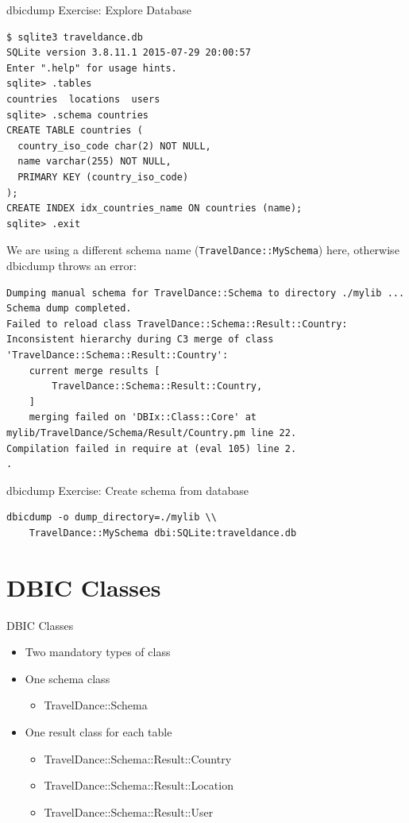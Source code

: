 \begin{frame}[fragile]{dbicdump Exercise: Explore Database}
\begin{lstlisting}
$ sqlite3 traveldance.db
SQLite version 3.8.11.1 2015-07-29 20:00:57
Enter ".help" for usage hints.
sqlite> .tables
countries  locations  users
sqlite> .schema countries
CREATE TABLE countries (
  country_iso_code char(2) NOT NULL,
  name varchar(255) NOT NULL,
  PRIMARY KEY (country_iso_code)
);
CREATE INDEX idx_countries_name ON countries (name);
sqlite> .exit
\end{lstlisting}
\end{frame}

We are using a different schema name (\verb|TravelDance::MySchema|) here,
otherwise dbicdump throws an error:

\begin{lstlisting}
Dumping manual schema for TravelDance::Schema to directory ./mylib ...
Schema dump completed.
Failed to reload class TravelDance::Schema::Result::Country: Inconsistent hierarchy during C3 merge of class 'TravelDance::Schema::Result::Country':
	current merge results [
		TravelDance::Schema::Result::Country,
	]
	merging failed on 'DBIx::Class::Core' at mylib/TravelDance/Schema/Result/Country.pm line 22.
Compilation failed in require at (eval 105) line 2.
.
\end{lstlisting}

\begin{frame}[fragile]{dbicdump Exercise: Create schema from database}
\begin{lstlisting}
dbicdump -o dump_directory=./mylib \\
    TravelDance::MySchema dbi:SQLite:traveldance.db
\end{lstlisting}
\end{frame}

\section{DBIC Classes}

\begin{frame}{DBIC Classes}
\begin{itemize}
\item Two mandatory types of class
\item One schema class
\begin{itemize}
\item TravelDance::Schema
\end{itemize}
\item One result class for each table
\begin{itemize}
\item TravelDance::Schema::Result::Country
\item TravelDance::Schema::Result::Location
\item TravelDance::Schema::Result::User
\end{itemize}
\end{itemize}
\end{frame}

